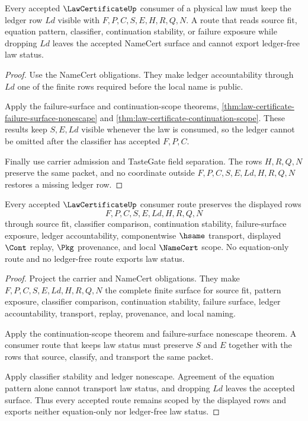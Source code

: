 \begin{theorem}
\label{thm:law-certificate-ledger-nonescape}
Every accepted $\LawCertificateUp$ consumer of a physical law must keep the ledger row $Ld$ visible with $F,P,C,S,E,H,R,Q,N$. A route that reads source fit, equation pattern, classifier, continuation stability, or failure exposure while dropping $Ld$ leaves the accepted NameCert surface and cannot export ledger-free law status.
\end{theorem}
\begin{proof}
Use the NameCert obligations. They make ledger accountability through $Ld$ one of the finite rows required before the local name is public.

Apply the failure-surface and continuation-scope theorems, \autoref{thm:law-certificate-failure-surface-nonescape} and \autoref{thm:law-certificate-continuation-scope}. These results keep $S,E,Ld$ visible whenever the law is consumed, so the ledger cannot be omitted after the classifier has accepted $F,P,C$.

Finally use carrier admission and TasteGate field separation. The rows $H,R,Q,N$ preserve the same packet, and no coordinate outside $F,P,C,S,E,Ld,H,R,Q,N$ restores a missing ledger row.
\end{proof}

\begin{theorem}
\label{thm:law-certificate-scope-transport}
Every accepted $\LawCertificateUp$ consumer route preserves the displayed rows
$$
F,P,C,S,E,Ld,H,R,Q,N
$$
through source fit, classifier comparison, continuation stability, failure-surface exposure, ledger accountability, componentwise $\hsame$ transport, displayed $\Cont$ replay, $\Pkg$ provenance, and local $\NameCert$ scope. No equation-only route and no ledger-free route exports law status.
\end{theorem}
\begin{proof}
Project the carrier and NameCert obligations. They make $F,P,C,S,E,Ld,H,R,Q,N$ the complete finite surface for source fit, pattern exposure, classifier comparison, continuation stability, failure surface, ledger accountability, transport, replay, provenance, and local naming.

Apply the continuation-scope theorem and failure-surface nonescape theorem. A consumer route that keeps law status must preserve $S$ and $E$ together with the rows that source, classify, and transport the same packet.

Apply classifier stability and ledger nonescape. Agreement of the equation pattern alone cannot transport law status, and dropping $Ld$ leaves the accepted surface. Thus every accepted route remains scoped by the displayed rows and exports neither equation-only nor ledger-free law status.
\end{proof}

